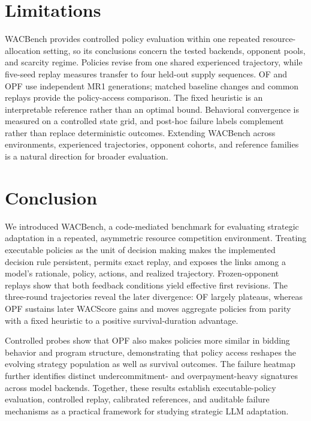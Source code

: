 \documentclass[letterpaper]{article} %
\begin{document}
\section{Limitations}

WACBench provides controlled policy evaluation within one repeated
resource-allocation setting, so its conclusions concern the tested backends,
opponent pools, and scarcity regime. Policies revise from one shared
experienced trajectory, while five-seed replay measures transfer to four
held-out supply sequences. OF and OPF use independent MR1 generations;
matched baseline changes and common replays provide the policy-access
comparison. The fixed heuristic is an interpretable reference rather than an
optimal bound. Behavioral convergence is measured on a controlled state
grid, and post-hoc failure labels complement rather than replace deterministic
outcomes. Extending WACBench across environments, experienced trajectories,
opponent cohorts, and reference families is a natural direction for broader
evaluation.

\section{Conclusion}

We introduced WACBench, a code-mediated benchmark for evaluating strategic
adaptation in a repeated, asymmetric resource competition environment.
Treating executable policies as the unit of decision making makes the
implemented decision rule persistent, permits exact replay, and exposes the
links among a model's rationale, policy, actions, and realized trajectory.
Frozen-opponent replays show that both feedback conditions yield effective
first revisions. The three-round trajectories reveal the later divergence:
OF largely plateaus, whereas OPF sustains later WACScore gains and moves aggregate
policies from parity with a fixed heuristic to a positive survival-duration
advantage.

Controlled probes show that OPF also makes policies more similar in bidding
behavior and program structure, demonstrating that policy access reshapes the
evolving strategy population as well as survival outcomes. The failure
heatmap further identifies distinct undercommitment- and overpayment-heavy
signatures across model backends. Together, these results establish
executable-policy evaluation, controlled replay, calibrated references, and
auditable failure mechanisms as a practical framework for studying strategic
LLM adaptation.


\end{document}

